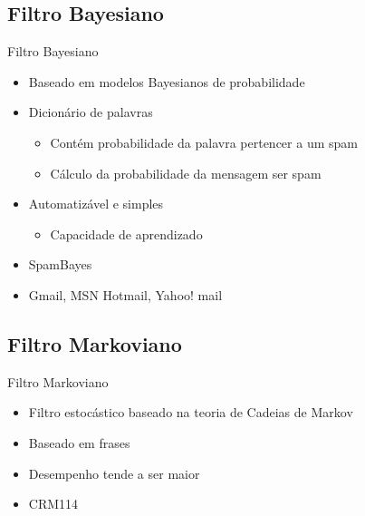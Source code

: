 \documentclass[dvipdfm]{beamer}
\begin{document}
\subsection{Filtro Bayesiano}
\begin{frame}{Filtro Bayesiano}
	\begin{itemize}
		\item Baseado em modelos Bayesianos de probabilidade
		\item Dicionário de palavras
		\begin{itemize}
			\item Contém probabilidade da palavra pertencer a um spam
			\item Cálculo da probabilidade da mensagem ser spam
		\end{itemize}
		\item Automatizável e simples
		\begin{itemize}
			\item Capacidade de aprendizado
		\end{itemize}
		\item SpamBayes
		\item Gmail, MSN Hotmail, Yahoo! mail
	\end{itemize}
\end{frame}

\subsection{Filtro Markoviano}
\begin{frame}{Filtro Markoviano}
	\begin{itemize}
		\item Filtro estocástico baseado na teoria de Cadeias de Markov
		\item Baseado em frases
		\item Desempenho tende a ser maior
		\item CRM114
	\end{itemize}
\end{frame}
\end{document}
